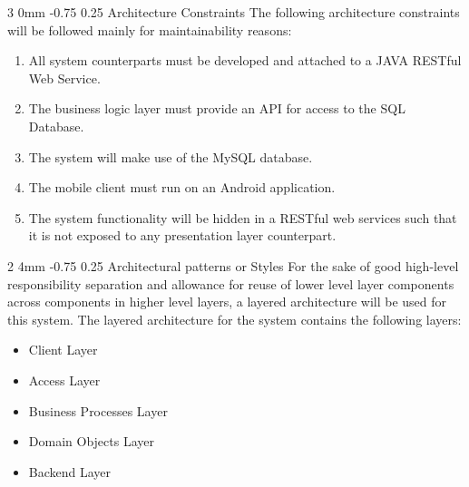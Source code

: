 \documentclass[12pt]{article}
\makeatletter
\renewcommand{\subsection}{\@startsection
   {subsection}%
   {2}%
   {4mm}%
   {-0.75\baselineskip}%
   {0.25\baselineskip}%
   {\rmfamily\normalfont\scshape\normalsize}}%
\renewcommand{\subsubsection}{\@startsection
   {subsubsection}%
   {3}%
   {0mm}%
   {-0.75\baselineskip}%
   {0.25\baselineskip}%
   {\rmfamily\normalfont\slshape\normalsize}}%
\makeatother
\begin{document}
                			\subsubsection{Architecture Constraints}
                					The following architecture constraints will be followed mainly for maintainability reasons:
                					\begin{enumerate}
                							\item All system counterparts must be developed and attached to a JAVA RESTful Web Service.
                							\item The business logic layer must provide an API for access to the SQL Database.
                							\item The system will make use of the MySQL database.
                							\item The mobile client must run on an Android application.
                							\item The system functionality will be hidden in a RESTful web services such that it is not exposed to any presentation layer counterpart.
                					\end{enumerate}
                				
                			  
                	\subsection{Architectural patterns or Styles}
                			For the sake of good high-level responsibility separation and allowance for reuse of lower level layer components across components in higher level layers, a layered architecture will be used for this system.
                			The layered architecture for the system contains the following layers:
                			\begin{itemize}
		                			\item Client Layer
		                			\item Access Layer
		                			\item Business Processes Layer
		                			\item Domain Objects Layer
		                			\item Backend Layer
                			\end{itemize} 
                			
\end{document}

